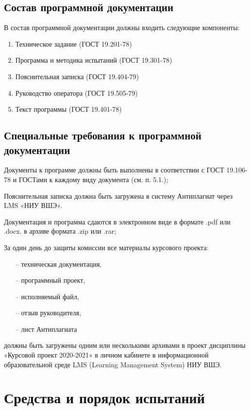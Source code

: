 \documentclass{../../includes/TechDocMultiAuthors}
\begin{document}
    \subsection{Состав программной документации}

    В состав программной документации должны входить следующие компоненты:
    \begin{enumerate}
        \item Техническое задание (ГОСТ 19.201-78)
        \item Программа и методика испытаний (ГОСТ 19.301-78)
        \item Пояснительная записка (ГОСТ 19.404-79)
        \item Руководство оператора (ГОСТ 19.505-79)
        \item Текст программы (ГОСТ 19.401-78)
    \end{enumerate}

    \subsection{Специальные требования к программной документации}

    Документы к программе должны быть выполнены в соответствии с ГОСТ 19.106-78 и ГОСТами к каждому виду документа (см. п. 5.1.);

    Пояснительная записка должна быть загружена в систему Антиплагиат через LMS «НИУ ВШЭ».

    Документация и программа сдаются в электронном виде в формате .pdf или .docx. в архиве формата .zip или .rar;

    За один день до защиты комиссии все материалы курсового проекта:
    \begin{itemize}
        \item[--] техническая документация,
        \item[--] программный проект,
        \item[--] исполняемый файл,
        \item[--] отзыв руководителя,
        \item[--] лист Антиплагиата
    \end{itemize}
    должны быть загружены одним или несколькими архивами в проект дисциплины «Курсовой проект 2020-2021» в личном кабинете в информационной образовательной среде LMS (Learning Management System) НИУ ВШЭ.

    \section{Средства и порядок испытаний}
\end{document}
